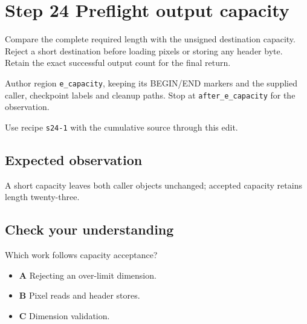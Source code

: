 \section{Step 24 Preflight output capacity}\label{ppm-s24}

Compare the complete required length with the unsigned destination capacity. Reject a short destination before loading pixels or storing any header byte. Retain the exact successful output count for the final return.

Author region \texttt{e\_capacity}, keeping its BEGIN/END markers and the supplied caller, checkpoint labels and cleanup paths. Stop at \texttt{after\_e\_capacity} for the observation.

Use recipe \texttt{s24-1} with the cumulative source through this edit.

\subsection{Expected observation}
A short capacity leaves both caller objects unchanged; accepted capacity retains length twenty-three.

\subsection{Check your understanding}
Which work follows capacity acceptance?

\begin{itemize}
\item \textbf{A} Rejecting an over-limit dimension.
\item \textbf{B} Pixel reads and header stores.
\item \textbf{C} Dimension validation.
\end{itemize}
